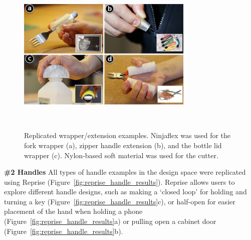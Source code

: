 
\begin{figure}[h!]
  \centering
  \includegraphics[width=0.75\textwidth]{figures/reprise_wrapper_results_v1.pdf}
  \caption{Replicated wrapper/extension examples. Ninjaflex was used for the fork wrapper (a), zipper handle extension (b), and the bottle lid wrapper (c). Nylon-based soft material was used for the cutter. }~\label{fig:reprise_wrapper_results}
\end{figure}


\textbf{\#2 Handles}
All types of handle examples in the design space were replicated using Reprise (Figure~\ref{fig:reprise_handle_results}). Reprise allows users to explore different handle designs, such as making a `closed loop' for holding and turning a key (Figure~\ref{fig:reprise_handle_results}c), or half-open for easier placement of the hand when holding a phone (Figure~\ref{fig:reprise_handle_results}a) or pulling open a cabinet door (Figure~\ref{fig:reprise_handle_results}b). 

